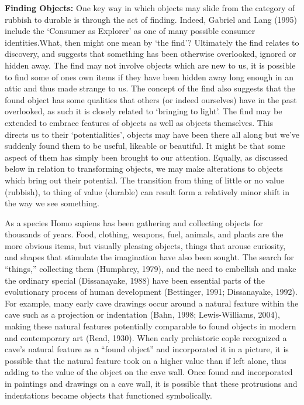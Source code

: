 \textbf{Finding Objects:} One key way in which objects may slide from the category of rubbish to durable is through the act of finding. Indeed, Gabriel and Lang (1995) include the ‘Consumer as Explorer’ as one of many possible consumer identities.What, then might one mean by ‘the find’? Ultimately the find relates to discovery, and suggests that something has been otherwise overlooked, ignored or hidden away. The find may not involve objects which are new to us, it is possible to find some of ones own items if they have been hidden away long enough in an attic and thus made strange to us. The concept of the find also suggests that the found object has some qualities that others (or indeed ourselves) have in the past overlooked, as such it is closely related to ‘bringing to light’. The find may be extended to embrace features of objects as well as objects themselves. This directs us to their ‘potentialities’, objects may have been there all along but we’ve suddenly found them to be useful, likeable or beautiful. It might be that some aspect of them has simply been brought to our attention. Equally, as discussed below in relation to transforming objects, we may make alterations to objects which bring out their potential. The transition from thing of little or no value (rubbish), to thing of value (durable) can result form a relatively minor shift in the way we see something.




As a species Homo sapiens has been gathering and collecting objects for thousands of years. Food, clothing, weapons, fuel, animals, and plants are the more obvious items, but visually pleasing objects, things that arouse curiosity, and shapes that stimulate the imagination have also been sought. The search for “things,” collecting them (Humphrey, 1979), and the need to embellish and make the ordinary special (Dissanayake, 1988) have been essential parts of the evolutionary process of human development (Bettinger, 1991; Dissanayake, 1992). For example, many early cave drawings occur around a natural feature within the cave such as a projection or indentation (Bahn, 1998; Lewis-Williams, 2004), making these natural features potentially comparable to found objects in modern and contemporary art (Read, 1930). When early prehistoric eople recognized a cave’s natural feature as a “found object” and incorporated it in a picture, it is possible that the natural feature took on a higher value than if left alone, thus adding to the value of the object on the cave wall. Once found and incorporated in paintings and drawings on a cave wall, it is possible that these protrusions and indentations became objects that functioned symbolically.

